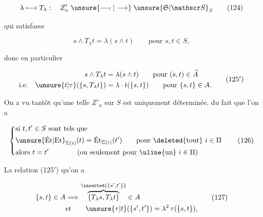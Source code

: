 

\[
 \lambda\longmapsto T_\lambda:\quad Z'_n\mathrel{\unsure{\relbar\joinrel\relbar\mkern-2mu\shortmid|\longrightarrow}}\unsure{\mathfrak S|\mathscr S}_S
 \tag*{(124)}
\]

qui satisfasse

\[
 s\wedge T_\lambda t=\lambda(s\wedge t)\qquad\text{pour }s,t\in S,
 \tag*{(125)}
\]

donc  en particulier

\[
 \begin{aligned}
 s\wedge T_\lambda t&=\lambda(s\wedge t)\qquad\text{pour }(s,t)\in\widetilde A\\
 \text{i.e.}\quad \unsure{t|\tau}(\{s,T_\lambda t\})&=\lambda\cdot t(\{s,t\})\qquad\text{pour }\{s,t\}\in A.
 \end{aligned}
 \tag*{(125$'$)}
\]

On a vu tantôt qu'une telle      $Z'_n$ sur $S$ est uniquement déterminée, du fait que l'on a

\[
 \left\{\begin{aligned}
 &\text{si }t,t'\in S\text{ sont tels que}\\
 &\unsure{\text{Ét}|\text{Et}}_{\Sigma(i)}(t)=\text{Ét}_{\Sigma(i)}(t')\qquad
 \text{pour \deleted{tout} }i\in\Pi\\
 &\text{alors }t=t'\qquad\qquad\text{(ou seulement pour \uline{un} }i\in\Pi\text{)}
 \end{aligned}\right.
 \tag*{(126)}
\]


La relation (125$'$)  qu'on a



\[
\begin{aligned}
 \{s,t\}\in A&\Longrightarrow
 \overbrace{\{T_\lambda s,T_\lambda t\}}^{\inserted{\{s',t'\}}}\in A\\
 &\text{et}\qquad \unsure{\tau|t}(\{s',t'\})=\lambda^2\,\tau(\{s,t\}),
\end{aligned}
\tag*{(127)}
\]

